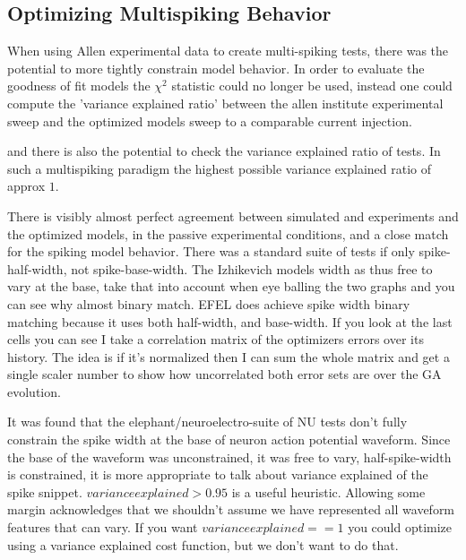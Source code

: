 \subsection{Optimizing Multispiking Behavior}

When using Allen experimental data to create multi-spiking tests, there was the potential to more tightly constrain model behavior. In order to evaluate the goodness of fit models the $\chi^{2}$ statistic could no longer be used, instead one could compute the 'variance explained ratio' between the allen institute experimental sweep and the optimized models sweep to a comparable current injection.

and there is also the potential to check the variance explained ratio of tests. In such a multispiking paradigm the highest possible variance explained ratio of approx $1$. 


There is visibly almost perfect  agreement between simulated and experiments and the optimized models, in the passive experimental conditions, and a close match for the spiking model behavior. There was a standard suite of tests if only spike-half-width, not spike-base-width. The Izhikevich models width as thus free to vary at the base, take that into account when eye balling the two graphs and you can see why almost binary match. EFEL does achieve spike width binary matching because it uses both half-width, and base-width. If you look at the last cells you can see I take a correlation matrix of the optimizers errors over its history. The idea is if it's normalized then I can sum the whole matrix and get a single scaler number to show how uncorrelated both error sets are over the GA evolution. 

It was found that the elephant/neuroelectro-suite of NU tests don't fully constrain the spike width at the base of neuron action potential waveform. Since the base of the waveform was unconstrained, it was free to vary, half-spike-width is constrained, it is more appropriate to talk about variance explained of the spike snippet. $variance explained>0.95$ is a useful heuristic. Allowing some margin acknowledges that we shouldn't assume we have represented all waveform features that can vary. If you want $variance explained==1$   
you could optimize using a variance explained 
cost function, but we don't want to do that.